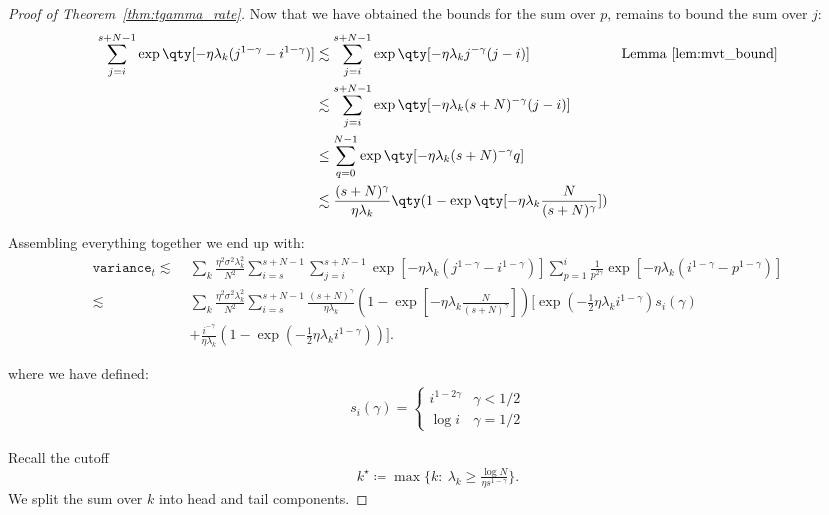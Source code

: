 \documentclass{article}
\def\variance{\mathtt{variance}}
\def\variance{\mathtt{variance}}
\theoremstyle{plain}
\def\variance{\mathtt{variance}}
\begin{document}
\begin{proof}[Proof of Theorem~\ref{thm:tgamma_rate}]
Now that we have obtained the bounds for the sum over $p$, remains to bound the sum over $j$:
\begin{align*}
     \sum_{j=i}^{s+N-1} \exp\qty[-\eta\lambda_k (j^{1-\gamma} - i^{1-\gamma})] &\lesssim \sum_{j=i}^{s+N-1} \exp\qty[-\eta\lambda_k j^{-\gamma}(j-i)] & \text{Lemma~\ref{lem:mvt_bound}}\\
     &\lesssim \sum_{j=i}^{s+N-1} \exp\qty[-\eta\lambda_k (s+N)^{-\gamma}(j-i)] \\
     &\leq \sum_{q=0}^{N-1} \exp\qty[-\eta\lambda_k (s+N)^{-\gamma}q] \\
     &\lesssim \frac{(s+N)^\gamma}{\eta \lambda_k} \qty(1 - \exp\qty[-\eta \lambda_k \frac{N}{(s+N)^\gamma}])
\end{align*}

Assembling everything together we end up with:
\begin{align*}
\variance_t \lesssim\; &
\sum_{k}\frac{\eta^2 \sigma^2 \lambda_k^2}{N^2}
\sum_{i=s}^{s+N-1} \sum_{j=i}^{s+N-1}
\exp\left[-\eta\lambda_k \left(j^{1-\gamma} - i^{1-\gamma}\right)\right]
\sum_{p=1}^{i} \frac{1}{p^{2\gamma}}
\exp\left[-\eta \lambda_k\left(i^{1-\gamma} - p^{1-\gamma}\right)\right] \\
\lesssim\; &
\sum_{k}\frac{\eta^2 \sigma^2 \lambda_k^2}{N^2}
\sum_{i=s}^{s+N-1}\frac{(s+N)^\gamma}{\eta \lambda_k}
\left(1 - \exp\left[-\eta \lambda_k \frac{N}{(s+N)^\gamma}\right]\right)
\Bigg[
\exp\left(-\frac{1}{2}\eta \lambda_k i^{1-\gamma}\right) s_i(\gamma)
\\&+ \frac{i^{-\gamma}}{\eta \lambda_k}
\left(1 - \exp\left(-\frac{1}{2} \eta \lambda_k i^{1-\gamma}\right)\right)
\Bigg].
\end{align*}

where we have defined:
\begin{align*}
    s_i(\gamma) = \begin{cases}
    i^{1 - 2\gamma} & \gamma < 1/2\\
    \log{i} & \gamma=1/2 
    \end{cases}
\end{align*}

Recall the cutoff
\[
k^\star \coloneqq \max\Big\{k:\ \lambda_k \ge \tfrac{\log N}{\eta s^{1-\gamma}}\Big\}.
\]
We split the sum over \(k\) into head and tail components.


\end{proof}
\end{document}

